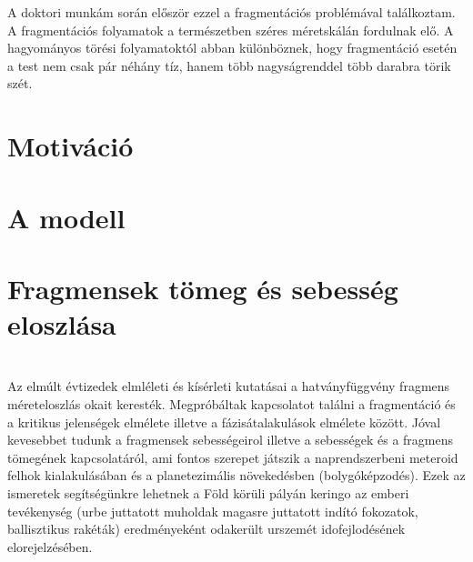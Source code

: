 A doktori munkám során először ezzel a fragmentációs problémával találkoztam. 
A fragmentációs folyamatok a természetben széres méretskálán fordulnak elő. A hagyományos törési folyamatoktól abban különböznek, hogy
fragmentáció esetén a test nem csak pár néhány tíz, hanem több nagyságrenddel több darabra törik szét.  
\section{Motiváció}

\section{A modell}
\section{Fragmensek tömeg és sebesség eloszlása}
\section{}


Az elmúlt évtizedek elmléleti és kísérleti kutatásai a hatványfüggvény fragmens méreteloszlás
okait keresték. Megpróbáltak kapcsolatot találni a fragmentáció és a kritikus jelenségek elmélete illetve
a fázisátalakulások elmélete között. Jóval kevesebbet tudunk a fragmensek sebességeirol
illetve a sebességek és a fragmens tömegének kapcsolatáról, ami fontos szerepet játszik a naprendszerbeni
meteroid felhok kialakulásában és a planetezimális növekedésben (bolygóképzodés). Ezek az ismeretek
segítségünkre lehetnek a Föld körüli pályán keringo az emberi tevékenység (urbe juttatott muholdak
magasre juttatott indító fokozatok, ballisztikus rakéták) eredményeként odakerült urszemét
idofejlodésének elorejelzésében.

